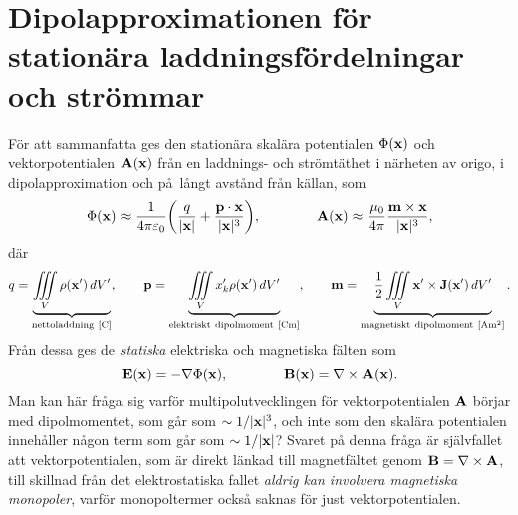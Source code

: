 \section{Dipolapproximationen f{\"o}r station{\"a}ra laddningsf{\"o}rdelningar
   och str{\"o}mmar}
F\"or att sammanfatta ges den station\"ara skal\"ara potentialen
$\Phi({\bf x})$ och vektorpotentialen ${\bf A}({\bf x})$ fr{\aa}n en
laddnings- och str\"omt\"athet i n{\"a}rheten av origo, i dipolapproximation
och p\aa\ l{\aa}ngt avst{\aa}nd fr{\aa}n k{\"a}llan, som
$$
  \Phi({\bf x})\approx{{1}\over{4\pi\varepsilon_0}}\bigg(
      {{q}\over{|{\bf x}|}} + {{{\bf p}\cdot{\bf x}}\over{|{\bf x}|^3}}
    \bigg),\qquad\qquad
  {\bf A}({\bf x})\approx{{\mu_0}\over{4\pi}}
      {{{\bf m}\times{\bf x}}\over{|{\bf x}|^3}},
$$
d\"ar
$$
  q=\underbrace{
      \iiint_{V} \rho({\bf x}')\,dV'
    }_{{\rm nettoladdning}\ [{\rm C}]},\qquad
  {\bf p}=\underbrace{
      \iiint_{V} x'_k \rho({\bf x}')\,dV'
    }_{{\rm elektriskt\ dipolmoment}\ [{\rm C}{\rm m}]},\qquad
  {\bf m}=\underbrace{
      {{1}\over{2}}\iiint_{V} {\bf x}'\times{\bf J}({\bf x}')\,dV'
    }_{{\rm magnetiskt\ dipolmoment}\ [{\rm A}{\rm m}^2]}.
$$
Fr{\aa}n dessa ges de {\it statiska} elektriska och magnetiska f\"alten
som
$$
  {\bf E}({\bf x})=-\nabla\Phi({\bf x}),\qquad\qquad
  {\bf B}({\bf x})=\nabla\times{\bf A}({\bf x}).
$$
Man kan h{\"a}r fr{\aa}ga sig varf{\"o}r multipolutvecklingen f{\"o}r
vektorpotentialen ${\bf A}$ b{\"o}rjar med dipolmomentet, som g{\aa}r som
$\sim 1/|{\bf x}|^3$, och inte som den skal{\"a}ra potentialen inneh{\aa}ller
n{\aa}gon term som g{\aa}r som $\sim 1/|{\bf x}|$? Svaret p{\aa} denna
fr{\aa}ga {\"a}r sj{\"a}lvfallet att vektorpotentialen, som {\"a}r direkt
l{\"a}nkad till magnetf{\"a}ltet genom ${\bf B}=\nabla\times{\bf A}$, till
skillnad fr{\aa}n det elektrostatiska fallet {\it aldrig kan involvera
magnetiska monopoler}, varf{\"o}r monopoltermer ocks{\aa} saknas f{\"o}r
just vektorpotentialen.
\bye
